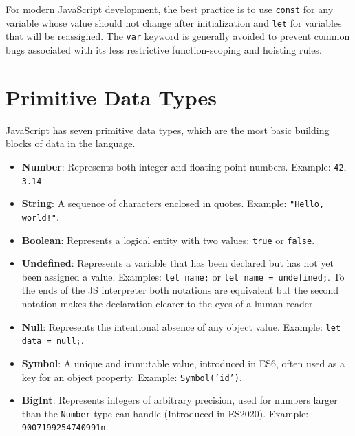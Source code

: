\documentclass{scrbook}
\begin{document}
For modern JavaScript development, the best practice is to use \texttt{const} for any variable whose value should not change after initialization and \texttt{let} for variables that will be reassigned. The \texttt{var} keyword is generally avoided to prevent common bugs associated with its less restrictive function-scoping and hoisting rules.

\section{Primitive Data Types}

JavaScript has seven primitive data types, which are the most basic building blocks of data in the language.

\begin{itemize}
    \item
    \textbf{Number}: Represents both integer and floating-point numbers. Example: \texttt{42}, \texttt{3.14}.
    
    \item
    \textbf{String}: A sequence of characters enclosed in quotes. Example: \texttt{"Hello, world!"}.
    
    \item
    \textbf{Boolean}: Represents a logical entity with two values: \texttt{true} or \texttt{false}.
    
    \item
    \textbf{Undefined}: Represents a variable that has been declared but has not yet been assigned a value. Examples: \texttt{let name;} or \texttt{let name = undefined;}. To the ends of the JS interpreter both notations are equivalent but the second notation makes the declaration clearer to the eyes of a human reader.
    
    \item
    \textbf{Null}: Represents the intentional absence of any object value. Example: \texttt{let data = null;}.
    
    \item
    \textbf{Symbol}: A unique and immutable value, introduced in ES6, often used as a key for an object property. Example: \texttt{Symbol('id')}.
    
    \item
    \textbf{BigInt}: Represents integers of arbitrary precision, used for numbers larger than the \texttt{Number} type can handle (Introduced in ES2020). Example: \texttt{9007199254740991n}.
\end{itemize}
\end{document}
